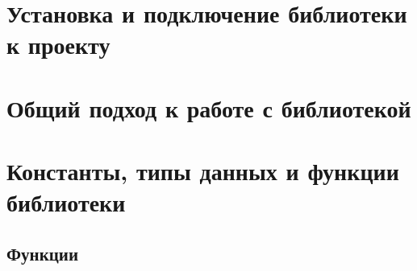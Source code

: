 \documentclass[12pt,a4paper,titlepage]{report}
\begin{document}
\chapter{Установка и подключение библиотеки к проекту}

\chapter{Общий подход к работе с библиотекой}


  
\chapter{Константы, типы данных и функции библиотеки}



%
%
%
\section{Функции}











\end{document}
